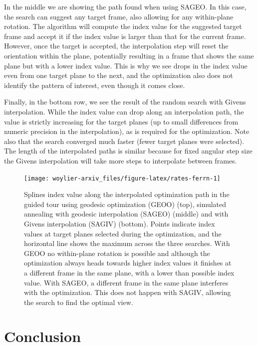 \documentclass[
]{article}
\begin{document}
In the middle we are showing the path found when using SAGEO. In this
case, the search can suggest any target frame, also allowing for any
within-plane rotation. The algorithm will compute the index value for
the suggested target frame and accept it if the index value is larger
than that for the current frame. However, once the target is accepted,
the interpolation step will reset the orientation within the plane,
potentially resulting in a frame that shows the same plane but with a
lower index value. This is why we see drops in the index value even from
one target plane to the next, and the optimization also does not
identify the pattern of interest, even though it comes close.

Finally, in the bottom row, we see the result of the random search with
Givens interpolation. While the index value can drop along an
interpolation path, the value is strictly increasing for the target
planes (up to small differences from numeric precision in the
interpolation), as is required for the optimization. Note also that the
search converged much faster (fewer target planes were selected). The
length of the interpolated paths is similar because for fixed angular
step size the Givens interpolation will take more steps to interpolate
between frames.

\begin{figure}

{\centering \texttt{[image: woylier-arxiv\_files/figure-latex/rates-ferrn-1]} 

}

\caption{Splines index value along the interpolated optimization path in the guided tour using geodesic optimization (GEOO) (top), simulated annealing with geodesic interpolation  (SAGEO) (middle) and with Givens interpolation (SAGIV) (bottom). Points indicate index values at target planes selected during the optimization, and the horizontal line shows the maximum across the three searches. With GEOO no within-plane rotation is possible and although the optimization always heads towards higher index values it finishes at a different frame in the same plane, with a lower than possible index value. With SAGEO, a different frame in the same plane interferes with the optimization. This does not happen with SAGIV, allowing the search to find the optimal view.}\label{fig:rates-ferrn}
\end{figure}

\hypertarget{conclusion}{%
\section{Conclusion}\label{conclusion}}
\end{document}

